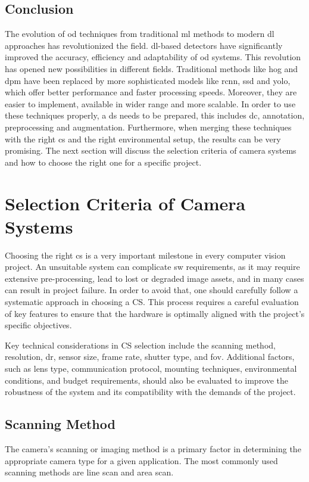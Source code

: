 \subsection{Conclusion}
The evolution of \gls{od} techniques from traditional \gls{ml} methods to modern \gls{dl} approaches has revolutionized the field. \gls{dl}-based detectors have significantly improved the accuracy, efficiency and adaptability of \gls{od} systems. This revolution has opened new possibilities in different fields. Traditional methods like \gls{hog} and \gls{dpm} have been replaced by more sophisticated models like \gls{rcnn}, \gls{ssd} and \gls{yolo}, which offer better performance and faster processing speeds. Moreover, they are easier to implement, available in wider range and more scalable. In order to use these techniques properly, a \gls{ds} needs to be prepared, this includes \gls{dc}, annotation, preprocessing and augmentation. Furthermore, when merging these techniques with the right \gls{cs} and the right environmental setup, the results can be very promising. The next section will discuss the selection criteria of camera systems and how to choose the right one for a specific project.

\section{Selection Criteria of Camera Systems}
Choosing the right \gls{cs} is a very important milestone in every computer vision project. An unsuitable system can complicate \gls{sw} requirements, as it may require extensive pre-processing, lead to lost or degraded image assets, and in many cases can result in project failure. In order to avoid that, one should carefully follow a systematic approach in choosing a CS. This process requires a careful evaluation of key features to ensure that the hardware is optimally aligned with the project’s specific objectives.

Key technical considerations in CS selection include the scanning method, resolution, \gls{dr}, sensor size, frame rate, shutter type, and \gls{fov}. Additional factors, such as lens type, communication protocol, mounting techniques, environmental conditions, and budget requirements, should also be evaluated to improve the robustness of the system and its compatibility with the demands of the project.

\subsection{Scanning Method}
The camera's scanning or imaging method is a primary factor in determining the appropriate camera type for a given application. The most commonly used scanning methods are line scan and area scan.

